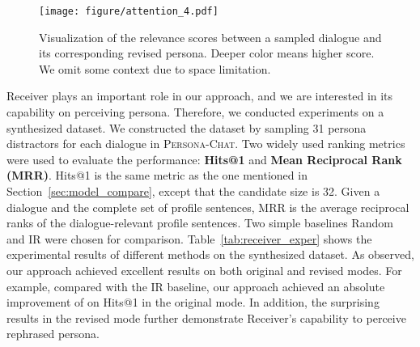 \documentclass[11pt,a4paper]{article}
\begin{document}
\begin{table}[t]
    \centering
    \caption{Experimental results on Persona Perception.}
    \label{tab:receiver_exper}
\end{table}

\begin{figure}[t]
    \centering
    \texttt{[image: figure/attention\_4.pdf]}
    \caption{Visualization of the relevance scores between a sampled dialogue and its corresponding revised persona. Deeper color means higher score. We omit some context due to space limitation.}
    \label{fig:receiver_heatmap}
\end{figure}

Receiver plays an important role in our approach, and we are interested in its capability on perceiving persona. Therefore, we conducted experiments on a synthesized dataset. 
We constructed the dataset by sampling 31 persona distractors for each dialogue in \textsc{Persona-Chat}. Two widely used ranking metrics were used to evaluate the performance: \textbf{Hits@1} and \textbf{Mean Reciprocal Rank (MRR)}. Hits@1 is the same metric as the one mentioned in Section~\ref{sec:model_compare}, except that the candidate size is 32. 
Given a dialogue and the complete set of profile sentences, MRR is the average reciprocal ranks of the dialogue-relevant profile sentences. Two simple baselines Random and IR \cite{sordonineural2015} were chosen for comparison. Table~\ref{tab:receiver_exper} shows the experimental results of different methods on the synthesized dataset. As observed, our approach achieved excellent results on both original and revised modes. For example, compared with the IR baseline, our approach achieved an absolute improvement of  on Hits@1 in the original mode. In addition, the surprising results in the revised mode further demonstrate Receiver's capability to perceive rephrased persona.
\end{document}

